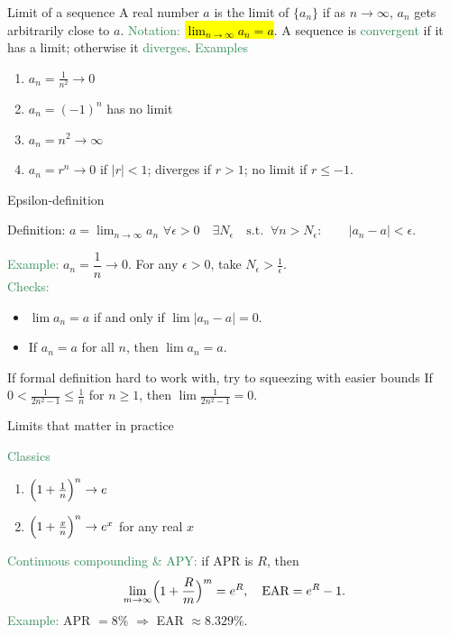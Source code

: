 \documentclass[11pt,aspectratio=169]{beamer}
\begin{document}
\begin{frame}{Limit of a sequence}
 A real number $a$ is the \alert{limit} of $\{a_n\}$ if as $n\to\infty$, $a_n$ gets arbitrarily close to $a$. \textcolor{SeaGreen}{Notation:} \hl{$\lim_{n \rightarrow \infty} a_n=a$}.
\vskip 8pt
A sequence is \textcolor{SeaGreen}{convergent} if it has a limit; otherwise it \textcolor{SeaGreen}{diverges}.
\vskip 8pt
\textcolor{SeaGreen}{Examples} 
\begin{enumerate}
\item $a_n=\frac{1}{n^2}\to 0$
\item $a_n=(-1)^n$ has no limit
\item $a_n=n^2\to \infty$
\item $a_n=r^n\to 0$ if $|r|<1$; diverges if $r>1$; no limit if $r\le -1$.
\end{enumerate}
\end{frame}



\begin{frame}{Epsilon-definition}
\begin{alertblock}{Definition: $a=\lim_{n\to\infty}a_n$}
\qquad$
\forall \epsilon >0 \quad\exists N_\epsilon\quad\text{s.t.}\;\;\forall n>N_\epsilon:\qquad |a_n-a| < \epsilon.
$	
\end{alertblock}

 \textcolor{SeaGreen}{Example:}  $a_n=\dfrac{1}{n}\to 0$. For any $\epsilon>0$, take $N_\epsilon>\frac{1}{\epsilon}$. \\[4mm]
 \textcolor{SeaGreen}{Checks:} 
 \begin{itemize}
 	\item $\lim a_n=a$ if and only if $\lim |a_n-a|=0$.
 	\item If $a_n=a$ for all $n$, then $\lim a_n=a$.
 \end{itemize}
\bigskip
\begin{block}{If formal definition hard to work with, try to squeezing with easier bounds}
If $0<\frac{1}{2n^2-1}\le \frac{1}{n}$ for $n\ge 1$, then $\lim \frac{1}{2n^2-1}=0$.
\end{block}
\end{frame}

\begin{frame}{Limits that matter in practice}

\textcolor{SeaGreen}{Classics} 
\begin{enumerate}
\item $\Bigl(1+\frac{1}{n}\Bigr)^n \to e$
\item $\Bigl(1+\frac{x}{n}\Bigr)^n \to e^{x}$ for any real $x$
\end{enumerate}

\textcolor{SeaGreen}{Continuous compounding \& APY:} if APR is $R$, then
\[
\lim_{m\to\infty}\Bigl(1+\frac{R}{m}\Bigr)^m=e^R,\quad
\text{EAR}=e^R-1.
\]
\textcolor{SeaGreen}{Example:} APR $=8\%$ $\Rightarrow$ EAR $\approx 8.329\%$.
\end{frame}
\end{document}
